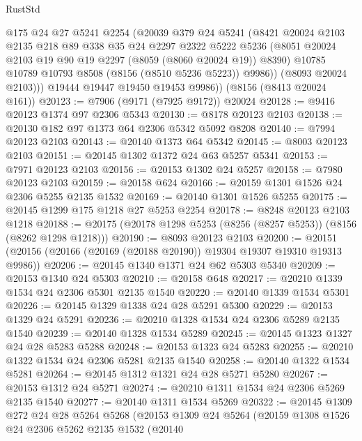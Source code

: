 \begin{lexlean}{RustStd}
\begin{coremodule}
            @175
            @24
            @27
            @5241
            @2254
            (@20039
              @379
              @24
              @5241
              (@8421
                @20024
                @2103
                @2135
                @218
                @89
                @338
                @35
                @24
                @2297
                @2322
                @5222
                @5236
                (@8051 @20024 @2103 @19 @90 @19 @2297 (@8059 (@8060 @20024 @19)) @8390)
                @10785
                @10789
                @10793
                @8508
                (@8156 (@8510 @5236 @5223))
                @9986))
            (@8093 @20024 @2103)))
        @19444
        @19447
        @19450
        @19453
        @9986))
    (@8156 (@8413 @20024 @161))
@20123 := @7906 (@9171 (@7925 @9172)) @20024
@20128 := @9416 @20123 @1374 @97 @2306 @5343
@20130 := @8178 @20123 @2103
@20138 := @20130 @182 @97 @1373 @64 @2306 @5342 @5092 @8208
@20140 := @7994 @20123 @2103
@20143 := @20140 @1373 @64 @5342
@20145 := @8003 @20123 @2103
@20151 := @20145 @1302 @1372 @24 @63 @5257 @5341
@20153 := @7971 @20123 @2103
@20156 := @20153 @1302 @24 @5257
@20158 := @7980 @20123 @2103
@20159 := @20158 @624
@20166 := @20159 @1301 @1526 @24 @2306 @5255 @2135 @1532
@20169 := @20140 @1301 @1526 @5255
@20175 := @20145 @1299 @175 @1218 @27 @5253 @2254
@20178 := @8248 @20123 @2103 @1218
@20188 := @20175 (@20178 @1298 @5253 (@8256 (@8257 @5253)) (@8156 (@8262 @1298 @1218)))
@20190 := @8093 @20123 @2103
@20200 := @20151 (@20156 (@20166 (@20169 (@20188 @20190)) @19304 @19307 @19310 @19313 @9986))
@20206 := @20145 @1340 @1371 @24 @62 @5303 @5340
@20209 := @20153 @1340 @24 @5303
@20210 := @20158 @648
@20217 := @20210 @1339 @1534 @24 @2306 @5301 @2135 @1540
@20220 := @20140 @1339 @1534 @5301
@20226 := @20145 @1329 @1338 @24 @28 @5291 @5300
@20229 := @20153 @1329 @24 @5291
@20236 := @20210 @1328 @1534 @24 @2306 @5289 @2135 @1540
@20239 := @20140 @1328 @1534 @5289
@20245 := @20145 @1323 @1327 @24 @28 @5283 @5288
@20248 := @20153 @1323 @24 @5283
@20255 := @20210 @1322 @1534 @24 @2306 @5281 @2135 @1540
@20258 := @20140 @1322 @1534 @5281
@20264 := @20145 @1312 @1321 @24 @28 @5271 @5280
@20267 := @20153 @1312 @24 @5271
@20274 := @20210 @1311 @1534 @24 @2306 @5269 @2135 @1540
@20277 := @20140 @1311 @1534 @5269
@20322 := @20145
    @1309
    @272
    @24
    @28
    @5264
    @5268
    (@20153
      @1309
      @24
      @5264
      (@20159
        @1308
        @1526
        @24
        @2306
        @5262
        @2135
        @1532
        (@20140

\end{coremodule}
\end{lexlean}
